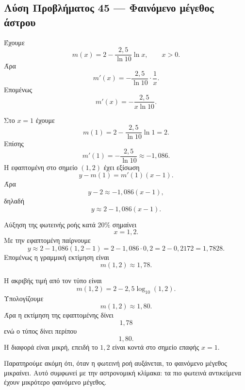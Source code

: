 \subsection*{Λύση Προβλήματος 45 --- Φαινόμενο μέγεθος άστρου}

\begin{alist}
  \item Έχουμε
        \[
          m(x)=2-\frac{2{,}5}{\ln 10}\ln x,
          \qquad x>0.
        \]
        Άρα
        \[
          m'(x)
          =
          -\frac{2{,}5}{\ln 10}\cdot\frac{1}{x}.
        \]
        Επομένως
        \[
          {
          m'(x)=-\frac{2{,}5}{x\ln 10}
          }.
        \]

  \item Στο $x=1$ έχουμε
        \[
          m(1)=2-\frac{2{,}5}{\ln 10}\ln1=2.
        \]
        Επίσης
        \[
          m'(1)=-\frac{2{,}5}{\ln 10}\approx -1{,}086.
        \]
        Η εφαπτομένη στο σημείο $(1,2)$ έχει εξίσωση
        \[
          y-m(1)=m'(1)(x-1).
        \]
        Άρα
        \[
          y-2\approx -1{,}086(x-1),
        \]
        δηλαδή
        \[
          {y\approx 2-1{,}086(x-1)}.
        \]

  \item Αύξηση της φωτεινής ροής κατά $20\%$ σημαίνει
        \[
          x=1{,}2.
        \]
        Με την εφαπτομένη παίρνουμε
        \[
          y
          \approx
          2-1{,}086(1{,}2-1)
          =
          2-1{,}086\cdot0{,}2
          =
          2-0{,}2172
          =
          1{,}7828.
        \]
        Επομένως η γραμμική εκτίμηση είναι
        \[
          {m(1{,}2)\approx 1{,}78}.
        \]

  \item Η ακριβής τιμή από τον τύπο είναι
        \[
          m(1{,}2)
          =
          2-2{,}5\log_{10}(1{,}2).
        \]
        Υπολογίζουμε
        \[
          m(1{,}2)\approx 1{,}80.
        \]
        Άρα η εκτίμηση της εφαπτομένης δίνει
        \[
          1{,}78
        \]
        ενώ ο τύπος δίνει περίπου
        \[
          1{,}80.
        \]
        Η διαφορά είναι μικρή, επειδή το $1{,}2$ είναι κοντά στο σημείο
        επαφής $x=1$.

        Παρατηρούμε ακόμη ότι, όταν η φωτεινή ροή αυξάνεται, το
        φαινόμενο μέγεθος μικραίνει. Αυτό συμφωνεί με την αστρονομική
        κλίμακα: τα πιο φωτεινά αντικείμενα έχουν μικρότερο φαινόμενο
        μέγεθος.
\end{alist}
